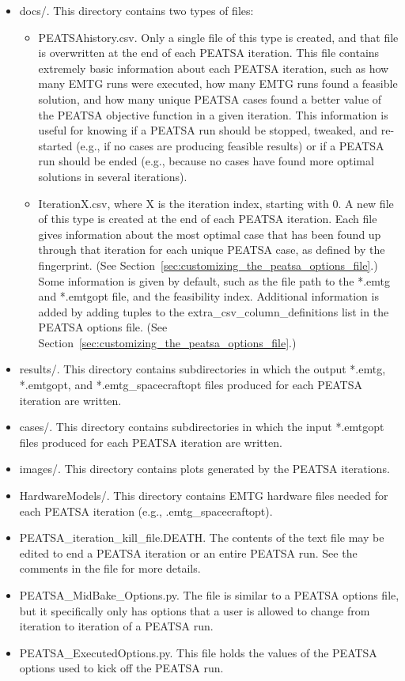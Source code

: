 \begin{itemize}
	\item docs/. This directory contains two types of files:
	\begin{itemize}
		\item PEATSAhistory.csv. Only a single file of this type is created, and that file is overwritten at the end of each \ac{PEATSA} iteration. This file contains extremely basic information about each \ac{PEATSA} iteration, such as how many \ac{EMTG} runs were executed, how many \ac{EMTG} runs found a feasible solution, and how many unique \ac{PEATSA} cases found a better value of the \ac{PEATSA} objective function in a given iteration. This information is useful for knowing if a \ac{PEATSA} run should be stopped, tweaked, and re-started (e.g., if no cases are producing feasible results) or if a \ac{PEATSA} run should be ended (e.g., because no cases have found more optimal solutions in several iterations).
		\item IterationX.csv, where X is the iteration index, starting with 0. A new file of this type is created at the end of each \ac{PEATSA} iteration. Each file gives information about the most optimal case that has been found up through that iteration for each unique \ac{PEATSA} case, as defined by the fingerprint. (See Section~\ref{sec:customizing_the_peatsa_options_file}.) Some information is given by default, such as the file path to the *.emtg and *.emtgopt file, and the feasibility index. Additional information is added by adding tuples to the extra\_csv\_column\_definitions list in the \ac{PEATSA} options file. (See Section~\ref{sec:customizing_the_peatsa_options_file}.)
	\end{itemize}
	\item results/. This directory contains subdirectories in which the output *.emtg, *.emtgopt, and *.emtg\_spacecraftopt files produced for each \ac{PEATSA} iteration are written.
	\item cases/. This directory contains subdirectories in which the input *.emtgopt files produced for each \ac{PEATSA} iteration are written.
	\item images/. This directory contains plots generated by the \ac{PEATSA} iterations.
	\item HardwareModels/. This directory contains \ac{EMTG} hardware files needed for each \ac{PEATSA} iteration (e.g., .emtg\_spacecraftopt).
	\item PEATSA\_iteration\_kill\_file.DEATH. The contents of the text file may be edited to end a \ac{PEATSA} iteration or an entire \ac{PEATSA} run. See the comments in the file for more details.
	\item PEATSA\_MidBake\_Options.py. The file is similar to a \ac{PEATSA} options file, but it specifically only has options that a user is allowed to change from iteration to iteration of a \ac{PEATSA} run.
	\item PEATSA\_ExecutedOptions.py. This file holds the values of the \ac{PEATSA} options used to kick off the \ac{PEATSA} run.
\end{itemize}